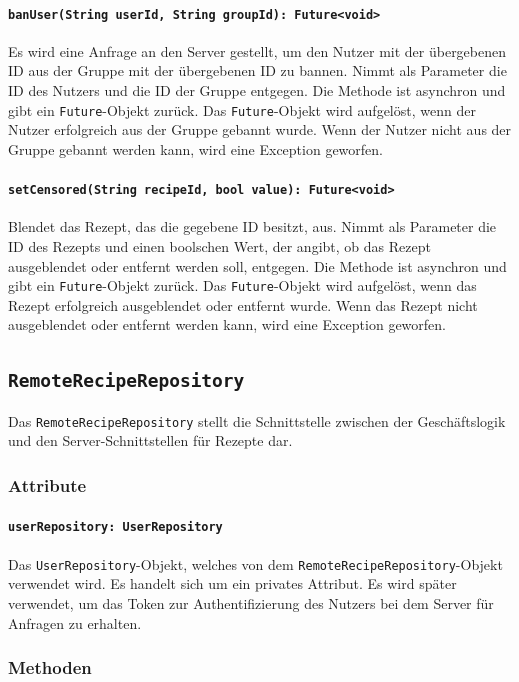 \documentclass{entwurfsheft}
\begin{document}
\paragraph{\texttt{banUser(String userId, String groupId): Future<void>}}
Es wird eine Anfrage an den Server gestellt, um den Nutzer mit der übergebenen ID aus der Gruppe mit der übergebenen ID zu bannen. Nimmt als Parameter die ID des Nutzers und die ID der Gruppe entgegen. Die Methode ist asynchron und gibt ein \texttt{Future}-Objekt zurück. Das \texttt{Future}-Objekt wird aufgelöst, wenn der Nutzer erfolgreich aus der Gruppe gebannt wurde. Wenn der Nutzer nicht aus der Gruppe gebannt werden kann, wird eine Exception geworfen.
\paragraph{\texttt{setCensored(String recipeId, bool value): Future<void>}}
Blendet das Rezept, das die gegebene ID besitzt, aus. Nimmt als Parameter die ID des Rezepts und einen boolschen Wert, der angibt, ob das Rezept ausgeblendet oder entfernt werden soll, entgegen. Die Methode ist asynchron und gibt ein \texttt{Future}-Objekt zurück. Das \texttt{Future}-Objekt wird aufgelöst, wenn das Rezept erfolgreich ausgeblendet oder entfernt wurde. Wenn das Rezept nicht ausgeblendet oder entfernt werden kann, wird eine Exception geworfen.
\newpage
\subsection{\texttt{RemoteRecipeRepository}}\label{sec:RemoteRecipeRepository}
Das \texttt{RemoteRecipeRepository} stellt die Schnittstelle zwischen der Geschäftslogik und den Server-Schnittstellen für Rezepte dar.
\subsubsection*{Attribute}
\paragraph{\texttt{userRepository: UserRepository}}
Das \texttt{UserRepository}-Objekt, welches von dem \texttt{Remote\-Recipe\-Repository}-Objekt verwendet wird. Es handelt sich um ein privates Attribut. Es wird später verwendet, um das Token zur Authentifizierung des Nutzers bei dem Server für Anfragen zu erhalten.
\subsubsection*{Methoden}
\end{document}
